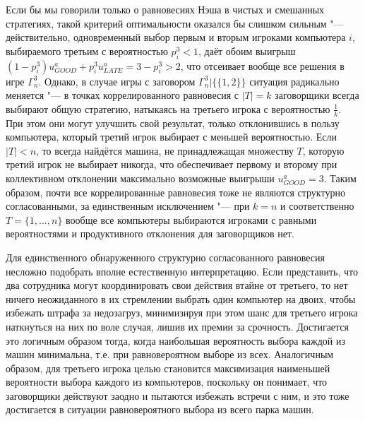 Если бы мы говорили только о равновесиях Нэша в чистых и смешанных стратегиях, такой критерий оптимальности оказался бы слишком сильным "--- действительно, одновременный выбор первым и вторым игроками компьютера $i$, выбираемого третьим с вероятностью $p_i^3 < 1$, даёт обоим выигрыш $(1 - p_i^3) u^a_{GOOD} + p_i^3 u^a_{LATE} = 3 - p_i^3 > 2$, что отсеивает вообще все решения в игре $\Gamma^3_n$. Однако, в случае игры с заговором $\Gamma^3_n | \{\{1,2\}\}$ ситуация радикально меняется "--- в точках коррелированного равновесия с $\left| T \right| = k$ заговорщики всегда выбирают общую стратегию, натыкаясь на третьего игрока с вероятностью $\frac{1}{k}$. При этом они могут улучшить свой результат, только отклонившись в пользу компьютера, который третий игрок выбирает с меньшей вероятностью. Если $\left| T \right| < n$, то всегда найдётся машина, не принадлежащая множеству $T$, которую третий игрок не выбирает никогда, что обеспечивает первому и второму при коллективном отклонении максимально возможные выигрыши $u^a_{GOOD} = 3$. Таким образом, почти все коррелированные равновесия тоже не являются структурно согласованными, за единственным исключением "--- при $k = n$ и соответственно $T = \{1, \ldots, n\}$ вообще все компьютеры выбираются игроками с равными вероятностями и продуктивного отклонения для заговорщиков нет.

Для единственного обнаруженного структурно согласованного равновесия несложно подобрать вполне естественную интерпретацию. Если представить, что два сотрудника могут координировать свои действия втайне от третьего, то нет ничего неожиданного в их стремлении выбрать один компьютер на двоих, чтобы избежать штрафа за недозагруз, минимизируя при этом шанс для третьего игрока наткнуться на них по воле случая, лишив их премии за срочность. Достигается это логичным образом тогда, когда наибольшая вероятность выбора каждой из машин минимальна, т.е. при равновероятном выборе из всех. Аналогичным образом, для третьего игрока целью становится максимизация наименьшей вероятности выбора каждого из компьютеров, поскольку он понимает, что заговорщики действуют заодно и пытаются избежать встречи с ним, и это тоже достигается в ситуации равновероятного выбора из всего парка машин.

\FloatBarrier
